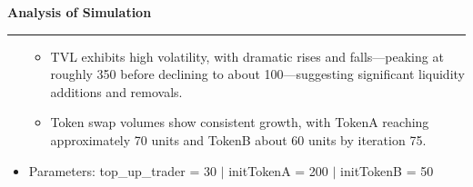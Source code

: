 \documentclass[a4paper]{article}
\newenvironment{solution}[2][]{%
\begin{mdframed}[linecolor=blue!70!black, linewidth=2pt, roundcorner=10pt, backgroundcolor=yellow!10!white, skipabove=12pt, skipbelow=12pt]%
	\textbf{\large #2}
	\par\noindent\rule{\textwidth}{0.4pt}
}{
\end{mdframed}
}
\begin{document}
\begin{solution}{Analysis of Simulation}
\begin{itemize}
\begin{itemize}
	\item TVL exhibits high volatility, with dramatic rises and falls—peaking at roughly 350 before declining to about 100—suggesting significant liquidity additions and removals.

	\item Token swap volumes show consistent growth, with TokenA reaching approximately 70 units and TokenB about 60 units by iteration 75.
  \end{itemize}
  
  

\item Parameters: top\_up\_trader = 30 $|$ initTokenA = 200 $|$ initTokenB = 50 
\begin{figure}[H]
   \centering
\end{figure}


\end{itemize}
\end{solution}
\end{document}

